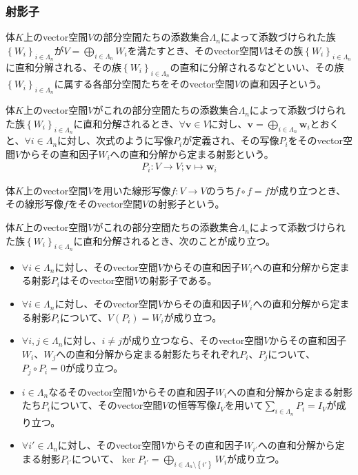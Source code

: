 \documentclass[dvipdfmx]{jsarticle}
\begin{document}
\subsubsection{射影子}%
\begin{dfn}
体$K$上のvector空間$V$の部分空間たちの添数集合$\varLambda_{n}$によって添数づけられた族$\left\{ W_{i} \right\}_{i \in \varLambda_{n}}$が$V = \bigoplus_{i \in \varLambda_{n}} W_{i}$を満たすとき、そのvector空間$V$はその族$\left\{ W_{i} \right\}_{i \in \varLambda_{n}}$に直和分解される、その族$\left\{ W_{i} \right\}_{i \in \varLambda_{n}}$の直和に分解されるなどといい、その族$\left\{ W_{i} \right\}_{i \in \varLambda_{n}}$に属する各部分空間たちをそのvector空間$V$の直和因子という。
\end{dfn}
\begin{dfn}
体$K$上のvector空間$V$がこれの部分空間たちの添数集合$\varLambda_{n}$によって添数づけられた族$\left\{ W_{i} \right\}_{i \in \varLambda_{n}}$に直和分解されるとき、$\forall\mathbf{v} \in V$に対し、$\mathbf{v} = \bigoplus_{i \in \varLambda_{n}} \mathbf{w}_{i}$とおくと、$\forall i \in \varLambda_{n}$に対し、次式のように写像$P_{i}$が定義され、その写像$P_{i}$をそのvector空間$V$からその直和因子$W_{i}$への直和分解から定まる射影という。
\begin{align*}
P_{i}:V \rightarrow V;\mathbf{v} \mapsto \mathbf{w}_{i}
\end{align*}
\end{dfn}
\begin{dfn}
体$K$上のvector空間$V$を用いた線形写像$f:V \rightarrow V$のうち$f \circ f = f$が成り立つとき、その線形写像$f$をそのvector空間$V$の射影子という。
\end{dfn}
\begin{thm}\label{2.2.1.8}
体$K$上のvector空間$V$がこれの部分空間たちの添数集合$\varLambda_{n}$によって添数づけられた族$\left\{ W_{i} \right\}_{i \in \varLambda_{n}}$に直和分解されるとき、次のことが成り立つ。
\begin{itemize}
\item
  $\forall i \in \varLambda_{n}$に対し、そのvector空間$V$からその直和因子$W_{i}$への直和分解から定まる射影$P_{i}$はそのvector空間$V$の射影子である。
\item
  $\forall i \in \varLambda_{n}$に対し、そのvector空間$V$からその直和因子$W_{i}$への直和分解から定まる射影$P_{i}$について、$V\left( P_{i} \right) = W_{i}$が成り立つ。
\item
  $\forall i,j \in \varLambda_{n}$に対し、$i \neq j$が成り立つなら、そのvector空間$V$からその直和因子$W_{i}$、$W_{j}$への直和分解から定まる射影たちそれぞれ$P_{i}$、$P_{j}$について、$P_{j} \circ P_{i} = 0$が成り立つ。
\item
  $i \in \varLambda_{n}$なるそのvector空間$V$からその直和因子$W_{i}$への直和分解から定まる射影たち$P_{i}$について、そのvector空間$V$の恒等写像$I_{V}$を用いて$\sum_{i \in \varLambda_{n}} P_{i} = I_{V}$が成り立つ。
\item
  $\forall i' \in \varLambda_{n}$に対し、そのvector空間$V$からその直和因子$W_{i'}$への直和分解から定まる射影$P_{i'}$について、$\ker P_{i'} = \bigoplus_{i \in \varLambda_{n} \setminus \left\{ i' \right\}} W_{i}$が成り立つ。
\end{itemize}
\end{thm}
\end{document}
